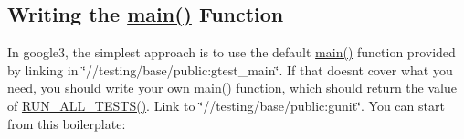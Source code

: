 \subsection*{Writing the \mbox{\hyperlink{3_814_83_2CompilerIdC_2CMakeCCompilerId_8c_a0ddf1224851353fc92bfbff6f499fa97}{main()}} Function}

In {\ttfamily google3}, the simplest approach is to use the default \mbox{\hyperlink{3_814_83_2CompilerIdC_2CMakeCCompilerId_8c_a0ddf1224851353fc92bfbff6f499fa97}{main()}} function provided by linking in {\ttfamily \char`\"{}//testing/base/public\+:gtest\+\_\+main\char`\"{}}. If that doesn\textquotesingle{}t cover what you need, you should write your own \mbox{\hyperlink{3_814_83_2CompilerIdC_2CMakeCCompilerId_8c_a0ddf1224851353fc92bfbff6f499fa97}{main()}} function, which should return the value of {\ttfamily \mbox{\hyperlink{gtest_8h_a853a3792807489591d3d4a2f2ff9359f}{R\+U\+N\+\_\+\+A\+L\+L\+\_\+\+T\+E\+S\+T\+S()}}}. Link to {\ttfamily \char`\"{}//testing/base/public\+:gunit\char`\"{}}. You can start from this boilerplate\+:


